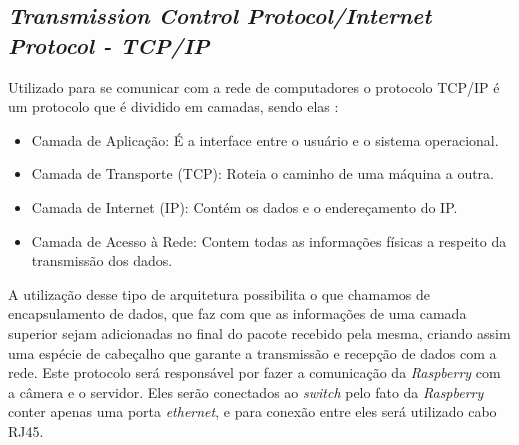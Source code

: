 \subsection{ \emph{Transmission Control Protocol/Internet Protocol - TCP/IP}}
Utilizado para se comunicar com a rede de computadores o protocolo TCP/IP é um protocolo que é dividido em camadas, sendo elas \cite{tcp1}:
\begin{itemize}
    \item Camada de Aplicação: É a interface entre o usuário e o sistema operacional.
    \item Camada de Transporte (TCP): Roteia o caminho de uma máquina a outra.
    \item Camada de Internet (IP): Contém os dados e o endereçamento do IP.
    \item Camada de Acesso à Rede: Contem todas as informações físicas a respeito da transmissão dos dados.
\end{itemize}
A utilização desse tipo de arquitetura possibilita o que chamamos de encapsulamento de dados, que faz com que as informações de uma camada superior sejam adicionadas no final do pacote recebido pela mesma, criando assim uma espécie de cabeçalho que garante a transmissão e recepção de dados com a rede.
Este protocolo será responsável por fazer a comunicação da \emph{Raspberry} com a câmera e o servidor. Eles serão conectados ao \emph{switch} pelo fato da \emph{Raspberry} conter apenas uma porta \emph{ethernet}, e para conexão entre eles será utilizado cabo RJ45.

